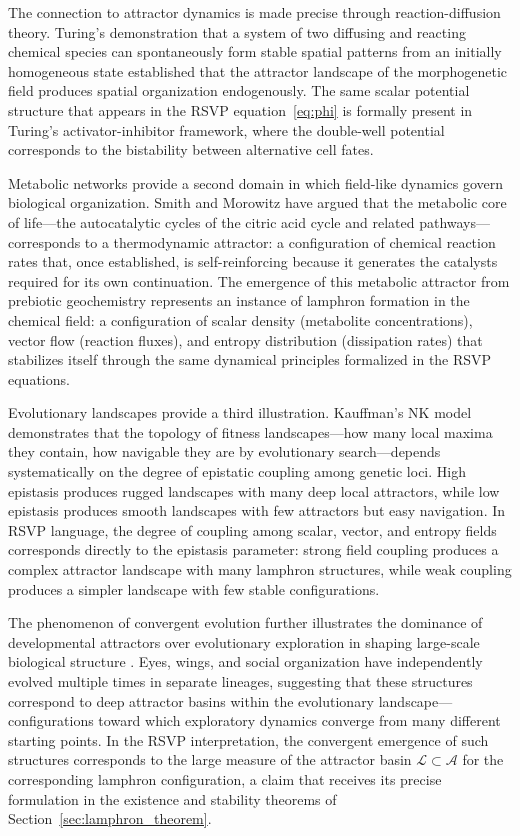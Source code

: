 \documentclass[12pt]{article}
\begin{document}
The connection to attractor dynamics is made precise through reaction-diffusion theory. Turing's demonstration \cite{nicolis1977} that a system of two diffusing and reacting chemical species can spontaneously form stable spatial patterns from an initially homogeneous state established that the attractor landscape of the morphogenetic field produces spatial organization endogenously. The same scalar potential structure that appears in the RSVP equation~\eqref{eq:phi} is formally present in Turing's activator-inhibitor framework, where the double-well potential corresponds to the bistability between alternative cell fates.

Metabolic networks provide a second domain in which field-like dynamics govern biological organization. Smith and Morowitz \cite{smithmorowitz2016} have argued that the metabolic core of life---the autocatalytic cycles of the citric acid cycle and related pathways---corresponds to a thermodynamic attractor: a configuration of chemical reaction rates that, once established, is self-reinforcing because it generates the catalysts required for its own continuation. The emergence of this metabolic attractor from prebiotic geochemistry represents an instance of lamphron formation in the chemical field: a configuration of scalar density (metabolite concentrations), vector flow (reaction fluxes), and entropy distribution (dissipation rates) that stabilizes itself through the same dynamical principles formalized in the RSVP equations.

Evolutionary landscapes provide a third illustration. Kauffman's NK model \cite{kauffman1993} demonstrates that the topology of fitness landscapes---how many local maxima they contain, how navigable they are by evolutionary search---depends systematically on the degree of epistatic coupling among genetic loci. High epistasis produces rugged landscapes with many deep local attractors, while low epistasis produces smooth landscapes with few attractors but easy navigation. In RSVP language, the degree of coupling among scalar, vector, and entropy fields corresponds directly to the epistasis parameter: strong field coupling produces a complex attractor landscape with many lamphron structures, while weak coupling produces a simpler landscape with few stable configurations.

The phenomenon of convergent evolution further illustrates the dominance of developmental attractors over evolutionary exploration in shaping large-scale biological structure \cite{kauffman1993,gellmann1994}. Eyes, wings, and social organization have independently evolved multiple times in separate lineages, suggesting that these structures correspond to deep attractor basins within the evolutionary landscape---configurations toward which exploratory dynamics converge from many different starting points. In the RSVP interpretation, the convergent emergence of such structures corresponds to the large measure of the attractor basin $\mathcal{L} \subset \mathcal{A}$ for the corresponding lamphron configuration, a claim that receives its precise formulation in the existence and stability theorems of Section~\ref{sec:lamphron_theorem}.
\end{document}
